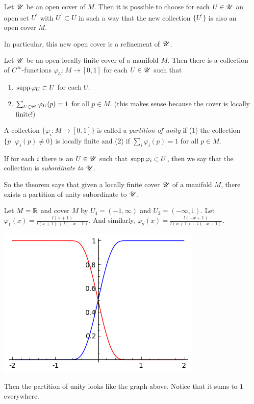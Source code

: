 \documentclass[11pt, english]{article}
\begin{document}
\begin{thm}
\label{shrinkinglemma}
Let $\mathscr{U}$ be an open cover of $M$. Then it is possible to choose for each $U \in \mathscr{U}$ an open set $U^\prime$ with $\bar{U^\prime} \subset U$ in such a way that the new collection $\{ U^\prime \}$ is also an open cover $M$. 
\end{thm}

\begin{remark}
In particular, this new open cover is a refinement of $\mathscr{U}$. 
\end{remark}

\begin{thm}

Let $\mathscr{U}$ be an open locally finite cover of a manifold $M$. Then there is a collection of $C^\infty$-functions  $\varphi_U:M \to [0,1]$ for each $U \in \mathscr{U}$ such that
\begin{enumerate}
\item $\operatorname{supp} \varphi_U \subset U$ for each $U$.
\item $\sum_{U \in \mathscr{U}} \varphi_U(p) = 1$ for all $p \in M$. (this makes sense because the cover is locally finite!)
\end{enumerate}
\end{thm}


\begin{defi}
  A collection $\{ \varphi_i:M \to [0,1] \}$ is called a \emph{partition of unity} if (1) the collection $\{ p \, | \, \varphi_i(p) \neq 0 \}$ is locally finite and (2) if $\sum_i \varphi_i(p)=1$ for all $p \in M$. 

If for each $i$ there is an $U \in \mathscr{U}$ such that $\operatorname{supp} \varphi_i \subset U$, then we say that the collection is \emph{subordinate to $\mathscr{U}$}. 
\end{defi}

So the theorem says that given a locally finite cover $\mathscr{U}$  of a manifold $M$, there exists a partition of unity subordinate to $\mathscr{U}$.

\begin{example}
Let $M= \mathbb{R}$ and cover $M$ by $U_1=(-1,\infty)$ and $U_2=(-\infty,1)$. Let $\varphi_1(x) = \frac{l(x+1)}{l(x+1)+l(-x-1)}$. And similarly, $\varphi_2(x) = \frac{l(-x+1)}{l(x+1)+l(-x+1)}$.
\begin{center}
\includegraphics{partition}
\end{center}
Then the partition of unity looks like the graph above. Notice that it sums to $1$ everywhere.
\end{example}
\end{document}

